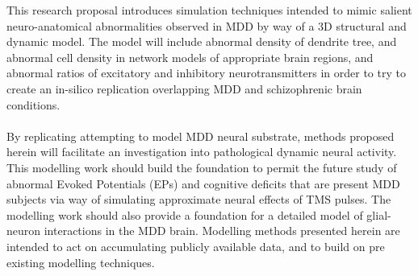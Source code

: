 \documentclass[a4paper,11pt]{article}
\begin{document}
This research proposal introduces simulation techniques intended to mimic salient neuro-anatomical abnormalities observed in MDD by way of a 3D structural and dynamic model. The model will include abnormal density of dendrite tree, and abnormal cell density in network models of appropriate brain regions, and abnormal ratios of excitatory and inhibitory neurotransmitters in order to try to create an in-silico replication overlapping MDD and schizophrenic brain conditions.\\ 
\\
By replicating attempting to model MDD neural substrate, methods proposed herein will facilitate an investigation into pathological dynamic neural activity. This modelling work should build the foundation to permit the future study of abnormal Evoked Potentials (EPs) and cognitive deficits that are present MDD subjects\cite{frodl2006reduced}\cite{sur2009event} via way of simulating approximate neural effects of TMS pulses. The modelling work should also provide a foundation for a detailed model of glial-neuron interactions in the MDD brain. Modelling methods presented herein are intended to act on accumulating publicly available data, and to build on pre existing modelling techniques.\\ 
\\
\end{document}
